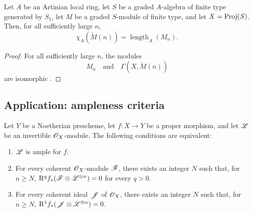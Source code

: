 \begin{corollary}[2.5.4]
\label{III.2.5.4}
Let $A$ be an Artinian local ring, let $S$ be a graded $A$-algebra of finite type generated by $S_1$, let $M$ be a graded $S$-module of finite type, and let $X=\operatorname{Proj}(S)$.
Then, for all sufficiently large $n$,
\[
  \chi_A(\widetilde{M}(n))
  =
  \operatorname{length}_A(M_n).
\]
\end{corollary}

\begin{proof}
For all sufficiently large $n$, the modules
\[
  M_n
  \quad\text{and}\quad
  \Gamma(X,\widetilde{M}(n))
\]
are isomorphic .
\end{proof}


\subsection{Application: ampleness criteria}
\label{subsection:III.2.6}

\begin{proposition}[2.6.1]
\label{III.2.6.1}
Let $Y$ be a Noetherian prescheme, let $f:X\to Y$ be a proper morphism,
and let $\mathscr{L}$ be an invertible $\mathscr{O}_X$-module.
The following conditions are equivalent:
\begin{enumerate}
  \item[\emph{a)}] $\mathscr{L}$ is ample for $f$.
  \item[\emph{b)}] For every coherent $\mathscr{O}_X$-module $\mathscr{F}$, there
  exists an integer $N$ such that, for $n\geq N$, $\mathrm{R}^qf_*(\mathscr{F}\otimes\mathscr{L}^{\otimes n})=0$
  for every $q>0$.
  \item[\emph{c)}] For every coherent ideal $\mathscr{J}$ of $\mathscr{O}_X$, there
  exists an integer $N$ such that, for $n\geq N$, $\mathrm{R}^1f_*(\mathscr{J}\otimes\mathscr{L}^{\otimes n})=0$.
\end{enumerate}
\end{proposition}


